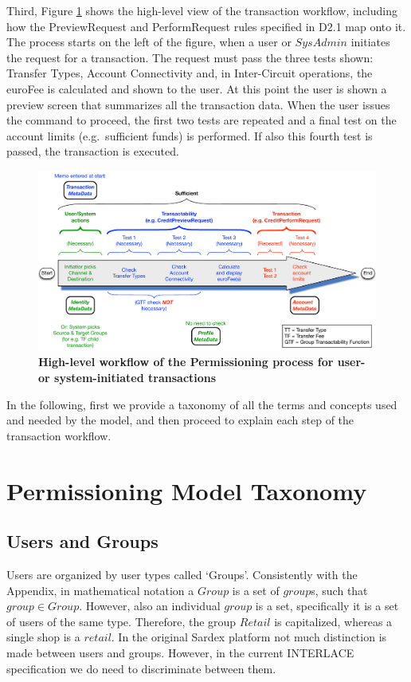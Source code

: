 Third, Figure \ref{fig:transactabilitywkflow} shows the high-level view of the transaction workflow, including how the PreviewRequest and PerformRequest rules specified in D2.1 map onto it. The process starts on the left of the figure, when a user or $SysAdmin$ initiates the request for a transaction. The request must pass the three tests shown: Transfer Types, Account Connectivity and, in Inter-Circuit operations, the euroFee is calculated and shown to the user. At this point the user is shown a preview screen that summarizes all the transaction data. When the user issues the command to proceed, the first two tests are repeated and a final test on the account limits (e.g.\ sufficient funds) is performed. If also this fourth test is passed, the transaction is executed.

\begin{figure}[h]
\centering
\includegraphics[width=17.5cm]{Figures/Transactability_Workflow}
\caption{\small\textbf{High-level workflow of the Permissioning process for user- or system-initiated transactions}}
\label{fig:transactabilitywkflow}
\end{figure}

In the following, first we provide a taxonomy of all the terms and concepts used and needed by the model, and then proceed to explain each step of the transaction workflow.


\section{Permissioning Model Taxonomy}
\subsection{Users and Groups}
Users are organized by user types called `Groups'. Consistently with the Appendix, in mathematical notation a $Group$ is a set of $group$s, such that $group \in Group$. However, also an individual $group$ is a set, specifically it is a set of users of the same type. Therefore, the group $Retail$ is capitalized, whereas a single shop is a $retail$. In the original Sardex platform not much distinction is made between users and groups. However, in the current INTERLACE specification we do need to discriminate between them.

